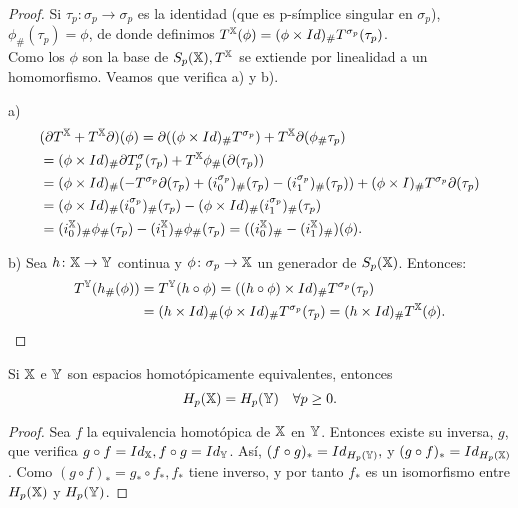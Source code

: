 \begin{proof}
  Si $\tau_p \colon \sigma_p \to \sigma_p$ es la identidad (que es p-símplice singular en $\sigma_p$), $\phi_\#(\tau_p) = \phi$,
  de donde definimos $T^{\mathbb X}(\phi) = (\phi \times Id)_\# T^{\sigma_p}(\tau_p)$. \\
  Como los $\phi$ son la base de $S_{p}({\mathbb X}), T^{\mathbb X}$ se extiende por linealidad a un homomorfismo. Veamos que verifica a) y b).

  a)
  \begin{align*}
    &(\partial T^{\mathbb X} + T^{\mathbb X} \partial)(\phi) = \partial((\phi \times Id)_\# T^{\sigma_p}) + T^{\mathbb X} \partial(\phi_\# \tau_p) \\
    &= (\phi \times Id)_\# \partial T^\sigma_p(\tau_p) + T^{\mathbb X} \phi_\#(\partial(\tau_p)) \\
    &= (\phi \times Id)_\# (- T^{\sigma_p} \partial(\tau_p) + (i_0^{\sigma_p})_\# (\tau_p) - (i_1^{\sigma_p})_\# (\tau_p)) + (\phi \times I)_\# T^{\sigma_p}\partial(\tau_p) \\
    &= (\phi \times Id)_\# (i_0^{\sigma_p})_\#(\tau_p) - (\phi \times Id)_\# (i_1^{\sigma_p})_\#(\tau_p) \\
    &= (i_0^{\mathbb X})_\# \phi_\#(\tau_p) - (i_1^{\mathbb X})_\# \phi_\#(\tau_p) = ((i_0^{\mathbb X})_\# - (i_1^{\mathbb X})_\#) (\phi).
  \end{align*}

  b) Sea $h\colon {\mathbb X} \to {\mathbb Y}$ continua y $\phi \colon \sigma_p \to {\mathbb X}$ un generador de $S_{p}({\mathbb X})$. Entonces:
  \begin{align*}
    T^{\mathbb Y}(h_\#(\phi)) &= T^{\mathbb Y}(h \circ \phi) = ((h \circ \phi) \times Id)_\# T^{\sigma_p}(\tau_p) \\
    &= (h \times Id)_\# (\phi \times Id)_\# T^{\sigma_p} (\tau_p) = (h \times Id)_\# T^{\mathbb X}(\phi).
  \end{align*}
\end{proof}

\begin{corollary}
  Si ${\mathbb X}$ e ${\mathbb Y}$ son espacios homotópicamente equivalentes, entonces \[H_p({\mathbb X}) = H_p({\mathbb Y}) \quad \forall p \geq 0.\]
\end{corollary}

\begin{proof}
  Sea $f$ la equivalencia homotópica de ${\mathbb X}$ en ${\mathbb Y}$. Entonces existe su inversa, $g$, que verifica $g \circ f = Id_{\mathbb X}, f \circ g = Id_{\mathbb Y}$.
  Así, $(f \circ g)_* = Id_{H_p({\mathbb Y})},$ y $(g \circ f)_* = Id_{H_p({\mathbb X})}$. Como $(g \circ f)_* = g_* \circ f_*, f_*$ tiene inverso, y por tanto
  $f_*$ es un isomorfismo entre $H_p({\mathbb X})$ y $H_p({\mathbb Y})$.
\end{proof}

